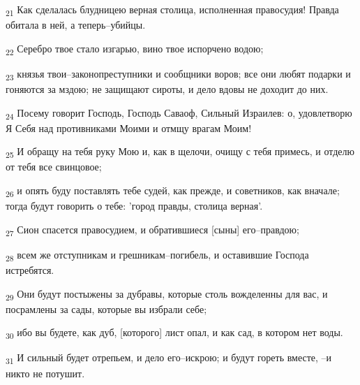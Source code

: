 \begin{tcolorbox}
\textsubscript{21} Как сделалась блудницею верная столица, исполненная правосудия! Правда обитала в ней, а теперь--убийцы.
\end{tcolorbox}
\begin{tcolorbox}
\textsubscript{22} Серебро твое стало изгарью, вино твое испорчено водою;
\end{tcolorbox}
\begin{tcolorbox}
\textsubscript{23} князья твои--законопреступники и сообщники воров; все они любят подарки и гоняются за мздою; не защищают сироты, и дело вдовы не доходит до них.
\end{tcolorbox}
\begin{tcolorbox}
\textsubscript{24} Посему говорит Господь, Господь Саваоф, Сильный Израилев: о, удовлетворю Я Себя над противниками Моими и отмщу врагам Моим!
\end{tcolorbox}
\begin{tcolorbox}
\textsubscript{25} И обращу на тебя руку Мою и, как в щелочи, очищу с тебя примесь, и отделю от тебя все свинцовое;
\end{tcolorbox}
\begin{tcolorbox}
\textsubscript{26} и опять буду поставлять тебе судей, как прежде, и советников, как вначале; тогда будут говорить о тебе: 'город правды, столица верная'.
\end{tcolorbox}
\begin{tcolorbox}
\textsubscript{27} Сион спасется правосудием, и обратившиеся [сыны] его--правдою;
\end{tcolorbox}
\begin{tcolorbox}
\textsubscript{28} всем же отступникам и грешникам--погибель, и оставившие Господа истребятся.
\end{tcolorbox}
\begin{tcolorbox}
\textsubscript{29} Они будут постыжены за дубравы, которые столь вожделенны для вас, и посрамлены за сады, которые вы избрали себе;
\end{tcolorbox}
\begin{tcolorbox}
\textsubscript{30} ибо вы будете, как дуб, [которого] лист опал, и как сад, в котором нет воды.
\end{tcolorbox}
\begin{tcolorbox}
\textsubscript{31} И сильный будет отрепьем, и дело его--искрою; и будут гореть вместе, --и никто не потушит.
\end{tcolorbox}
